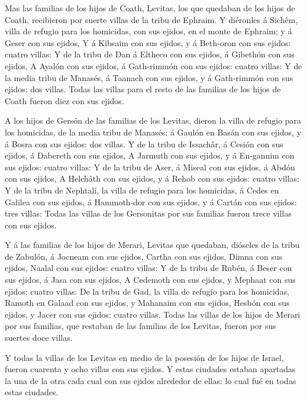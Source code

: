  Mas las familias de los hijos de Coath, Levitas, los que
quedaban de los hijos de Coath, recibieron por suerte villas de la tribu
de Ephraim.  Y diéronles á Sichêm, villa de refugio para
los homicidas, con sus ejidos, en el monte de Ephraim; y á Geser con sus
ejidos,  Y á Kibsaim con sus ejidos, y á Beth-oron con sus
ejidos: cuatro villas:  Y de la tribu de Dan á Eltheco con
sus ejidos, á Gibethón con sus ejidos,  A Ayalón con sus
ejidos, á Gath-rimmón con sus ejidos: cuatro villas:  Y de
la media tribu de Manasés, á Taanach con sus ejidos, y á Gath-rimmón con
sus ejidos: dos villas.  Todas las villas para el resto de
las familias de los hijos de Coath fueron diez con sus ejidos.

 A los hijos de Gersón de las familias de los Levitas,
dieron la villa de refugio para los homicidas, de la media tribu de
Manasés: á Gaulón en Basán con sus ejidos, y á Bosra con sus ejidos: dos
villas.  Y de la tribu de Issachâr, á Cesión con sus
ejidos, á Dabereth con sus ejidos,  A Jarmuth con sus
ejidos, y á En-gannim con sus ejidos: cuatro villas:  Y de
la tribu de Aser, á Miseal con sus ejidos, á Abdón con sus ejidos,
 A Helchâth con sus ejidos, y á Rehob con sus ejidos:
cuatro villas:  Y de la tribu de Nephtalí, la villa de
refugio para los homicidas, á Cedes en Galilea con sus ejidos, á
Hammoth-dor con sus ejidos, y á Cartán con sus ejidos: tres villas:
 Todas las villas de los Gersonitas por sus familias fueron
trece villas con sus ejidos.

 Y á las familias de los hijos de Merari, Levitas que
quedaban, dióseles de la tribu de Zabulón, á Jocneam con sus ejidos,
Cartha con sus ejidos,  Dimna con sus ejidos, Naalal con
sus ejidos: cuatro villas:  Y de la tribu de Rubén, á Beser
con sus ejidos, á Jasa con sus ejidos,  A Cedemoth con sus
ejidos, y Mephaat con sus ejidos: cuatro villas:  De la
tribu de Gad, la villa de refugio para los homicidas, Ramoth en Galaad
con sus ejidos, y Mahanaim con sus ejidos,  Hesbón con sus
ejidos, y Jacer con sus ejidos: cuatro villas.  Todas las
villas de los hijos de Merari por sus familias, que restaban de las
familias de los Levitas, fueron por sus suertes doce villas.

 Y todas la villas de los Levitas en medio de la posesión
de los hijos de Israel, fueron cuarenta y ocho villas con sus ejidos.
 Y estas ciudades estaban apartadas la una de la otra cada
cual con sus ejidos alrededor de ellas: lo cual fué en todas estas
ciudades.


